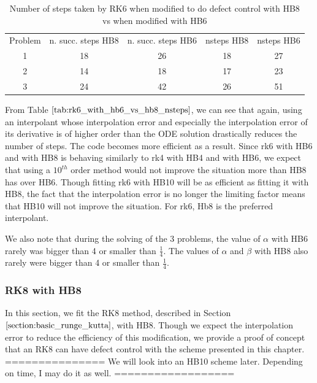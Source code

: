 \documentclass{article}
\begin{document}
\begin{table}[h]
\caption {Number of steps taken by RK6 when modified to do defect control with HB8 vs when modified with HB6} \label{tab:rk6_with_hb6_vs_hb8_nsteps}
\begin{center}
\begin{tabular}{ c c c c c } 
Problem & n. succ. steps HB8 & n. succ. steps HB6 & nsteps HB8 & nsteps HB6 \\ 
1       & 18                 &        26          & 18         & 27\\ 
2       & 14                 &        18          & 17         & 23\\
3       & 24                 &        42          & 26         & 51\\
\end{tabular}
\end{center}
\end{table}

From Table $\ref{tab:rk6_with_hb6_vs_hb8_nsteps}$, we can see that again, using an interpolant whose interpolation error and especially the interpolation error of its derivative is of higher order than the ODE solution drastically reduces the number of steps. The code becomes more efficient as a result. Since rk6 with HB6 and with HB8 is behaving similarly to rk4 with HB4 and with HB6, we expect that using a $10^{th}$ order method would not improve the situation more than HB8 has over HB6. Though fitting rk6 with HB10 will be as efficient as fitting it with HB8, the fact that the interpolation error is no longer the limiting factor means that HB10 will not improve the situation. For rk6, Hb8 is the preferred interpolant.  

We also note that during the solving of the 3 problems, the value of $\alpha$ with HB6 rarely was bigger than 4 or smaller than $\frac{1}{4}$. The values of $\alpha$ and $\beta$ with HB8 also rarely were bigger than 4 or smaller than $\frac{1}{4}$. 

\subsubsection{RK8 with HB8}
In this section, we fit the RK8 method, described in Section $\ref{section:basic_runge_kutta}$, with HB8. Though we expect the interpolation error to reduce the efficiency of this modification, we provide a proof of concept that an RK8 can have defect control with the scheme presented in this chapter. 
===============
We will look into an HB10 scheme later. Depending on time, I may do it as well.
==================
\end{document}
